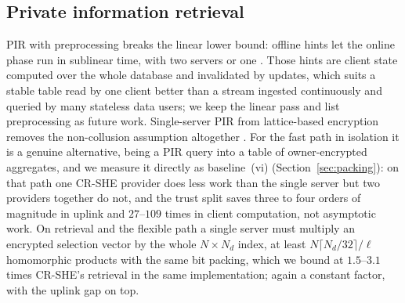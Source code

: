 \documentclass[a4paper,fleqn]{cas-sc}
\begin{document}
\subsection{Private information retrieval}
PIR with preprocessing breaks the linear lower bound: offline hints let the
online phase run in sublinear time, with two servers
\citep{corrigan2020private} or one \citep{corrigan2022single,zhou2024piano}.
Those hints are client state computed over the whole database and invalidated
by updates, which suits a stable table read by one client better than a stream
ingested continuously and queried by many stateless data users; we keep the
linear pass and list preprocessing as future work. Single-server PIR from
lattice-based encryption
\citep{angel2018pir,mughees2021onionpir,menon2022spiral,davidson2023frodopir}
removes the non-collusion assumption altogether
\citep{kushilevitz1997replication}. For the fast path in isolation it is a
genuine alternative, being a PIR query into a table of owner-encrypted
aggregates, and we measure it directly as baseline~(vi)
(Section~\ref{sec:packing}): on that path one CR-SHE provider does less work
than the single server but two providers together do not, and the trust split
saves three to four orders of magnitude in uplink and $27$--$109$ times in
client computation, not asymptotic work. On retrieval and the flexible path a single server must
multiply an encrypted selection vector by the whole $N\times N_d$ index, at
least $N\lceil N_d/32\rceil/\ell$ homomorphic products with the same bit
packing, which we bound at $1.5$--$3.1$ times CR-SHE's retrieval in the same
implementation; again a constant factor, with the uplink gap on top.
\end{document}
